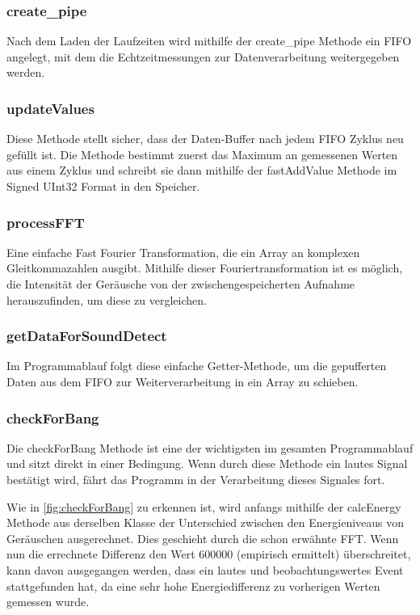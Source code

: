 \subsubsection{create\_pipe}

Nach dem Laden der Laufzeiten wird mithilfe der create\_pipe Methode ein FIFO angelegt, mit dem die Echtzeitmessungen zur Datenverarbeitung weitergegeben werden.

\subsubsection{updateValues}

Diese Methode stellt sicher, dass der Daten-Buffer nach jedem FIFO Zyklus neu gefüllt ist. Die Methode bestimmt zuerst das Maximum an gemessenen Werten aus einem Zyklus und schreibt sie dann mithilfe der fastAddValue Methode im Signed UInt32 Format in den Speicher.

\subsubsection{processFFT}

Eine einfache \glqq Fast Fourier Transformation\grqq, die ein Array an komplexen Gleitkommazahlen ausgibt. Mithilfe dieser Fouriertransformation ist es möglich, die Intensität der Geräusche von der zwischengespeicherten Aufnahme herauszufinden, um diese zu vergleichen.


\subsubsection{getDataForSoundDetect}

Im Programmablauf folgt diese einfache Getter-Methode, um die gepufferten Daten aus dem FIFO zur Weiterverarbeitung in ein Array zu schieben.

\subsubsection{checkForBang}

Die checkForBang Methode ist eine der wichtigsten im gesamten Programmablauf und sitzt direkt in einer Bedingung. Wenn durch diese Methode ein lautes Signal bestätigt wird, fährt das Programm in der Verarbeitung dieses Signales fort.

Wie in \autoref{fig:checkForBang} zu erkennen ist, wird anfangs mithilfe der calcEnergy Methode aus derselben Klasse der Unterschied zwischen den Energieniveaus von Geräuschen ausgerechnet. Dies geschieht durch die schon erwähnte FFT. Wenn nun die errechnete Differenz den Wert 600000 (empirisch ermittelt) überschreitet, kann davon ausgegangen werden, dass ein lautes und beobachtungswertes Event stattgefunden hat, da eine sehr hohe Energiedifferenz zu vorherigen Werten gemessen wurde.


